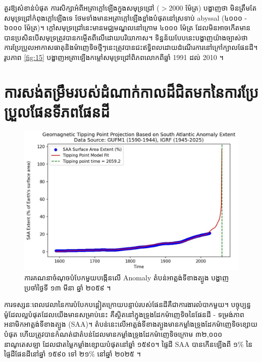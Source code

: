 \documentclass[10pt,twocolumn,letterpaper]{article}
\begin{document}
គួរឱ្យសំខាន់បំផុត ការសិក្សាអំពីអត្រាក្ដៅឡើងក្នុងសមុទ្រជ្រៅ ($>$2000 ម៉ែត្រ) បង្ហាញថា មិនត្រឹមតែសមុទ្រជ្រៅកំពុងក្ដៅឡើងទេ ថែមទាំងមានអត្រាក្ដៅឡើងខ្លាំងបំផុតនៅស្រទាប់ abyssal (៤០០០ - ៦០០០ ម៉ែត្រ)។ ក្ដៅសមុទ្រជ្រៅនេះមានមជ្ឈមណ្ឌលនៅក្រោម ៤០០០ ម៉ែត្រ \cite{132,129} ដែលមិនអាចកើតមានបានប្រសិនបើសមុទ្រត្រូវបានកម្ចើតពីលើដោយបរិយាកាស។ ទិន្នន័យបែបនេះបង្ហាញយ៉ាងច្បាស់ថា ការប្រែប្រួលអាកាសធាតុនិងម៉ាញេទិចថ្មីៗនេះត្រូវបានជះឥទ្ធិពលដោយដំណើរការនៅក្រៅក្បាលផែនដី។ រូបភាព \ref{fig:15} បង្ហាញអត្រាឡើងកម្ដៅសមុទ្រ​ជ្រៅពិភពលោកពីឆ្នាំ 1991 ដល់ 2010 \cite{132}។
\section{ការសង់តម្រឹមរបស់ដំណាក់កាលដ៏ជិតមកនៃការប្រែប្រួលផែនទីភពផែនដី}

\begin{figure}[b]
\begin{center}
   \includegraphics[width=1\linewidth]{saa-crop.jpeg}
\end{center}
   \caption{ការគណនាចំណុចបំបែក​មួយបង្កើនលើ Anomaly តំបន់អាត្លង់ទីខាងត្បូង បង្ហាញប្រចាំថ្ងៃទី ១៣ មីនា ឆ្នាំ ២០៥៩ \cite{125,126}។}
\label{fig:16}
\label{fig:onecol}
\end{figure}

ការទស្សនៈពេលវេលានៃការបំបែកបន្តៀតក្រោយបន្ទាប់របស់ផែនដីគឺជាការងារលំបាកមួយ។ បច្ចុប្បន្ន ម៉ូដែលល្អបំផុតដែលយើងមានសម្រាប់នេះ គឺស្ថិតនៅក្នុងទ្រូងដែកម៉ាញេទិចនៃផែនដី - ទម្រង់ភាពអនាមិកអាត្លង់ទីខាងត្បូង (SAA)។ តំបន់នេះលើអាត្លង់ទីខាងត្បូងមានកម្លាំងទ្រូងដែកម៉ាញេទិចខ្សោយបំផុត ហើយត្រូវបានកំណត់ជាតំបន់ដែលមានកម្លាំងទ្រូងដែកម៉ាញេទិចក្រោម ៣២,០០០ នាណូតេសឡា \cite{135} ដែលជាតម្លៃកម្លាំងខ្សោយបំផុតនៅឆ្នាំ ១៥៩០។ ផ្ទៃដី SAA បានកើនឡើងពី ១\% នៃផ្ទៃដីផែនដីនៅឆ្នាំ ១៥៩០ ទៅ ២១\% នៅឆ្នាំ ២០២៥ \cite{136}។
\end{document}
